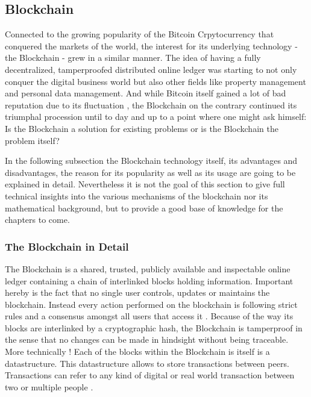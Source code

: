 \subsection{Blockchain}
\label{subsec:02_blockchain}

Connected to the growing popularity of the Bitcoin Crpytocurrency that conquered the markets of the world, the interest for its underlying technology - the Blockchain - grew in a similar manner. The idea of having a fully decentralized, tamperproofed distributed online ledger was starting to not only conquer the digital business world but also other fields like property management and personal data management. And while Bitcoin itself gained a lot of bad reputation due to its fluctuation \cite{Shackelford2016}, the Blockchain on the contrary continued its triumphal procession until to day and up to a point where one might ask himself: Is the Blockchain a solution for existing problems or is the Blockchain the problem itself? \cite{Stinchcombe2017} \cite{Nielsen2018}

In the following subsection the Blockchain technology itself, its advantages and disadvantages, the reason for its popularity as well as its usage are going to be explained in detail. Nevertheless it is not the goal of this section to give full technical insights into the various mechanisms of the blockchain nor its mathematical background, but to provide a good base of knowledge for the chapters to come.

\subsubsection{The Blockchain in Detail}
The Blockchain is a shared, trusted, publicly available and inspectable online ledger containing a chain of interlinked blocks holding information. Important hereby is the fact that no single user controls, updates or maintains the blockchain. Instead every action performed on the blockchain is following strict rules and a consensus amongst all users that access it \cite{Shackelford2016}. Because of the way its blocks are interlinked by a cryptographic hash, the Blockchain is tamperproof in the sense that no changes can be made in hindsight without being traceable. 
More technically \cite{BenAyed2017}!
Each of the blocks within the Blockchain is itself is a datastructure.  This datastructure allows to store transactions between peers. Transactions can refer to any kind of digital or real world transaction between two or multiple people \cite{Wust2017}.



